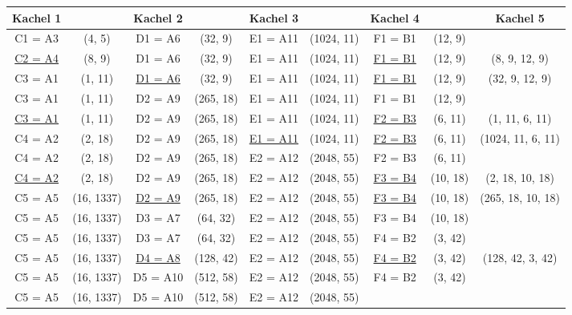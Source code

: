 \begin{solution}
	\hspace{-2.3cm}\begin{tabular}{|cc|cc|cc|cc|c|}
		\hline
		\textbf{Kachel 1} &   & \textbf{Kachel 2} &  & \textbf{Kachel 3} & & \textbf{Kachel 4} & & \textbf{Kachel 5} \\
		\hline
		\cellcolor{orange} C1 = A3 & (4, 5) & D1 = A6 & (32, 9) & E1 = A11 & (1024, 11) & F1 = B1 & (12, 9) &  \\
		\hline
		\cellcolor{orange}\underline{C2 = A4} & (8, 9) & D1 = A6& (32, 9) & E1 = A11 & (1024, 11) & \underline{F1 = B1} & (12, 9) & (8, 9, 12, 9)\\
		\hline
		C3 = A1 & (1, 11) & \cellcolor{orange}\underline{D1 = A6}& (32, 9) & E1 = A11 & (1024, 11) & \underline{F1 = B1} & (12, 9) &(32, 9, 12, 9) \\
		\hline
		C3 = A1 & (1, 11) & D2 = A9 & (265, 18) & E1 = A11 & (1024, 11) & \cellcolor{orange} F1 = B1 & (12, 9) &  \\
		\hline
		\cellcolor{orange}\underline{C3 = A1} & (1, 11) & D2 = A9 & (265, 18) & E1 = A11 & (1024, 11) & \underline{F2 = B3} & (6, 11) & (1, 11, 6, 11)\\
		\hline
		C4 = A2 & (2, 18) & D2 = A9 & (265, 18) & \cellcolor{orange}\underline{E1 = A11} & (1024, 11) & \underline{F2 = B3} & (6, 11) & (1024, 11, 6, 11) \\
		\hline
		C4 = A2 & (2, 18) & D2 = A9 & (265, 18) & E2 = A12 & (2048, 55) & \cellcolor{orange}F2 = B3 & (6, 11) & \\
		\hline
		\cellcolor{orange}\underline{C4 = A2} & (2, 18) & D2 = A9 & (265, 18) & E2 = A12 & (2048, 55) & \underline{F3 = B4} & (10, 18) & (2, 18, 10, 18)\\
		\hline
		C5 = A5 & (16, 1337) & \cellcolor{orange} \underline{D2 = A9} & (265, 18) & E2 = A12 & (2048, 55) & \underline{F3 = B4} & (10, 18) & (265, 18, 10, 18)\\
		\hline
		C5 = A5 & (16, 1337) & D3 = A7 & (64, 32) & E2 = A12 & (2048, 55) & \cellcolor{orange}F3 = B4 & (10, 18) & \\
		\hline
		C5 = A5 & (16, 1337) &\cellcolor{orange} D3 = A7 & (64, 32) & E2 = A12 & (2048, 55) & F4 = B2 & (3, 42) & \\
		\hline
		C5 = A5 & (16, 1337) &\cellcolor{orange}\underline{D4 = A8} & (128, 42) & E2 = A12 & (2048, 55) & \underline{F4 = B2} & (3, 42) & (128, 42, 3, 42)\\
		\hline
		C5 = A5 & (16, 1337) &D5 = A10 & (512, 58) & E2 = A12 & (2048, 55) & \cellcolor{orange}F4 = B2 & (3, 42) &\\
		\hline
		C5 = A5 & (16, 1337) &D5 = A10 & (512, 58) & E2 = A12 & (2048, 55) &  &  &
		\\
		\hline
	\end{tabular}


\end{solution}
